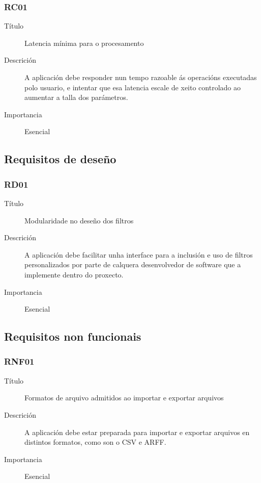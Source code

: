 \subsubsection*{RC01}
\begin{description}
\item[Título] \hfill
Latencia mínima para o procesamento
\item[Descrición] \hfill
A aplicación debe responder nun tempo razoable ás operacións executadas polo usuario, e intentar que esa latencia escale de xeito controlado ao aumentar a talla dos parámetros.
\item[Importancia] \hfill
Esencial
\end{description}

\subsection{Requisitos de deseño}

\subsubsection*{RD01}
\begin{description}
\item[Título] \hfill
Modularidade no deseño dos filtros
\item[Descrición] \hfill
A aplicación debe facilitar unha interface para a inclusión e uso de filtros personalizados por parte de calquera desenvolvedor de software que a implemente dentro do proxecto.
\item[Importancia] \hfill
Esencial
\end{description}

\subsection{Requisitos non funcionais}

\subsubsection*{RNF01}
\begin{description}
\item[Título] \hfill
Formatos de arquivo admitidos ao importar e exportar arquivos
\item[Descrición] \hfill
A aplicación debe estar preparada para importar e exportar arquivos en distintos formatos, como son o CSV e ARFF.
\item[Importancia] \hfill
Esencial
\end{description}

